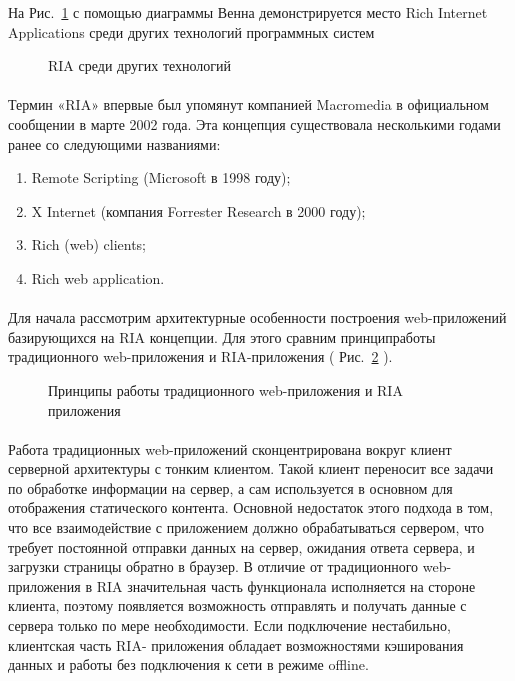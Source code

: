 На Рис.~\ref{ris:RIAinWorld.png} с помощью диаграммы Венна демонстрируется место Rich Internet Applications среди других технологий программных систем
\begin{figure}[h]
\caption{RIA среди других технологий}
\label{ris:RIAinWorld.png}
\end{figure}

\paragraph{ }

Термин «RIA» впервые был упомянут компанией  Macromedia в официальном сообщении в марте 2002 года. Эта концепция существовала несколькими годами ранее со следующими названиями:

\begin{enumerate}

\item Remote Scripting (Microsoft в 1998 году);
\item X Internet (компания Forrester Research в 2000 году);
\item Rich (web) clients; 
\item Rich web application. 

\end{enumerate}

\paragraph{ }

Для начала рассмотрим архитектурные особенности построения web-приложений базирующихся на RIA  концепции.  Для этого сравним принципработы традиционного web-приложения и RIA-приложения ( Рис.~\ref{ris:principlesRIA.png} ).  
\begin{figure}[h]
\caption{Принципы работы традиционного web-приложения и RIA приложения}
\label{ris:principlesRIA.png}
\end{figure}

\paragraph{ }

Работа традиционных web-приложений сконцентрирована вокруг клиент серверной архитектуры с тонким клиентом.  Такой клиент переносит все задачи по обработке информации на сервер, а сам используется в основном для отображения статического контента.  Основной недостаток этого подхода в том,  что все взаимодействие с приложением должно обрабатываться сервером,  что требует постоянной отправки данных на сервер,  ожидания ответа сервера,  и загрузки страницы обратно в браузер. В отличие от традиционного web-приложения в RIA  значительная часть функционала исполняется на стороне клиента,  поэтому появляется возможность отправлять и получать данные с сервера только по мере необходимости.  Если подключение нестабильно,  клиентская часть RIA- приложения обладает возможностями кэширования данных и работы без подключения к сети в режиме offline.

